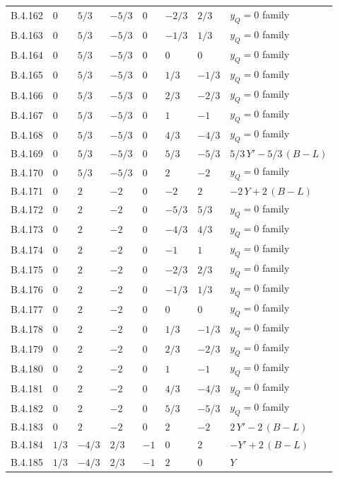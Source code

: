 {\begin{longtable}{@{}lllllll>{\raggedright\arraybackslash}p{5.6cm}@{}}
B.4.162 & $0$ & $5/3$ & $-5/3$ & $0$ & $-2/3$ & $2/3$ & $y_Q=0$ family \\
B.4.163 & $0$ & $5/3$ & $-5/3$ & $0$ & $-1/3$ & $1/3$ & $y_Q=0$ family \\
B.4.164 & $0$ & $5/3$ & $-5/3$ & $0$ & $0$ & $0$ & $y_Q=0$ family \\
B.4.165 & $0$ & $5/3$ & $-5/3$ & $0$ & $1/3$ & $-1/3$ & $y_Q=0$ family \\
B.4.166 & $0$ & $5/3$ & $-5/3$ & $0$ & $2/3$ & $-2/3$ & $y_Q=0$ family \\
B.4.167 & $0$ & $5/3$ & $-5/3$ & $0$ & $1$ & $-1$ & $y_Q=0$ family \\
B.4.168 & $0$ & $5/3$ & $-5/3$ & $0$ & $4/3$ & $-4/3$ & $y_Q=0$ family \\
B.4.169 & $0$ & $5/3$ & $-5/3$ & $0$ & $5/3$ & $-5/3$ & $5/3\,Y'-5/3\,(B{-}L)$ \\
B.4.170 & $0$ & $5/3$ & $-5/3$ & $0$ & $2$ & $-2$ & $y_Q=0$ family \\
B.4.171 & $0$ & $2$ & $-2$ & $0$ & $-2$ & $2$ & $-2\,Y+2\,(B{-}L)$ \\
B.4.172 & $0$ & $2$ & $-2$ & $0$ & $-5/3$ & $5/3$ & $y_Q=0$ family \\
B.4.173 & $0$ & $2$ & $-2$ & $0$ & $-4/3$ & $4/3$ & $y_Q=0$ family \\
B.4.174 & $0$ & $2$ & $-2$ & $0$ & $-1$ & $1$ & $y_Q=0$ family \\
B.4.175 & $0$ & $2$ & $-2$ & $0$ & $-2/3$ & $2/3$ & $y_Q=0$ family \\
B.4.176 & $0$ & $2$ & $-2$ & $0$ & $-1/3$ & $1/3$ & $y_Q=0$ family \\
B.4.177 & $0$ & $2$ & $-2$ & $0$ & $0$ & $0$ & $y_Q=0$ family \\
B.4.178 & $0$ & $2$ & $-2$ & $0$ & $1/3$ & $-1/3$ & $y_Q=0$ family \\
B.4.179 & $0$ & $2$ & $-2$ & $0$ & $2/3$ & $-2/3$ & $y_Q=0$ family \\
B.4.180 & $0$ & $2$ & $-2$ & $0$ & $1$ & $-1$ & $y_Q=0$ family \\
B.4.181 & $0$ & $2$ & $-2$ & $0$ & $4/3$ & $-4/3$ & $y_Q=0$ family \\
B.4.182 & $0$ & $2$ & $-2$ & $0$ & $5/3$ & $-5/3$ & $y_Q=0$ family \\
B.4.183 & $0$ & $2$ & $-2$ & $0$ & $2$ & $-2$ & $2\,Y'-2\,(B{-}L)$ \\
B.4.184 & $1/3$ & $-4/3$ & $2/3$ & $-1$ & $0$ & $2$ & $-Y'+2\,(B{-}L)$ \\
B.4.185 & $1/3$ & $-4/3$ & $2/3$ & $-1$ & $2$ & $0$ & $Y$ \\

\end{longtable}}
